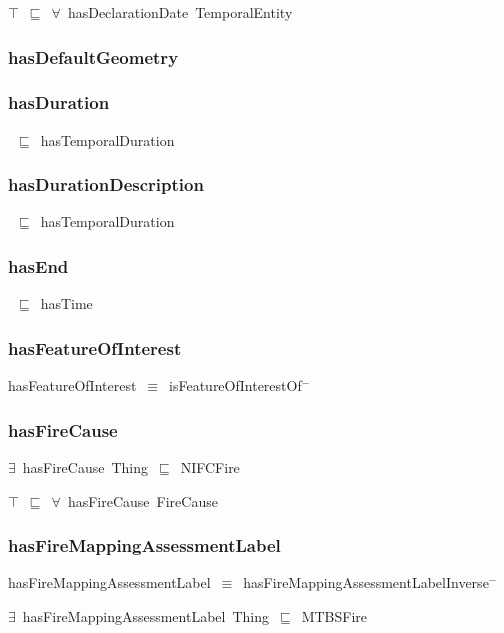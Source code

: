 \documentclass{article}
\begin{document}
\ensuremath{\top}~\ensuremath{\sqsubseteq}~\ensuremath{\forall}~hasDeclarationDate~TemporalEntity

\subsubsection*{hasDefaultGeometry}

\subsubsection*{hasDuration}

~\ensuremath{\sqsubseteq}~hasTemporalDuration

\subsubsection*{hasDurationDescription}

~\ensuremath{\sqsubseteq}~hasTemporalDuration

\subsubsection*{hasEnd}

~\ensuremath{\sqsubseteq}~hasTime

\subsubsection*{hasFeatureOfInterest}

hasFeatureOfInterest~\ensuremath{\equiv}~isFeatureOfInterestOf\ensuremath{^-}

\subsubsection*{hasFireCause}

\ensuremath{\exists}~hasFireCause~Thing~\ensuremath{\sqsubseteq}~NIFCFire

\ensuremath{\top}~\ensuremath{\sqsubseteq}~\ensuremath{\forall}~hasFireCause~FireCause

\subsubsection*{hasFireMappingAssessmentLabel}

hasFireMappingAssessmentLabel~\ensuremath{\equiv}~hasFireMappingAssessmentLabelInverse\ensuremath{^-}

\ensuremath{\exists}~hasFireMappingAssessmentLabel~Thing~\ensuremath{\sqsubseteq}~MTBSFire
\end{document}
